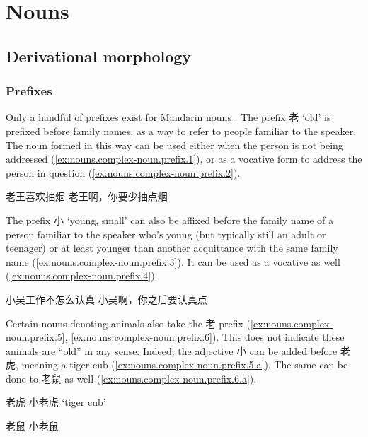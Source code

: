 \documentclass[UTF8, a4paper, oneside, scheme=plain, 12pt]{ctexrep}
\newcommand*{\citepage}[1]{p.~{#1}}
\newcommand{\translate}[1]{`#1'}
\begin{document}
\chapter{Nouns}

\section{Derivational morphology}

\subsection{Prefixes}

Only a handful of prefixes exist for Mandarin nouns
\citep[\citepage{37}]{zhudexigrammar}.
The prefix 老 \translate{old} is prefixed before family names,
as a way to refer to people familiar to the speaker.
The noun formed in this way can be used either when the person is not being addressed
(\ref{ex:nouns.complex-noun.prefix.1}),
or as a vocative form to address the person in question
(\ref{ex:nouns.complex-noun.prefix.2}).

\begin{exe}
    \ex\label{ex:nouns.complex-noun.prefix.1} 老王喜欢抽烟
    \ex\label{ex:nouns.complex-noun.prefix.2} 老王啊，你要少抽点烟
\end{exe}

The prefix 小 \translate{young, small} can also be affixed
before the family name of a person familiar to the speaker
who's young (but typically still an adult or teenager)
or at least younger than another acquittance with the same family name
(\ref{ex:nouns.complex-noun.prefix.3}).
It can be used as a vocative as well (\ref{ex:nouns.complex-noun.prefix.4}).

\begin{exe}
    \ex\label{ex:nouns.complex-noun.prefix.3} 小吴工作不怎么认真
    \ex\label{ex:nouns.complex-noun.prefix.4} 小吴啊，你之后要认真点
\end{exe}

Certain nouns denoting animals also take the 老 prefix
(\ref{ex:nouns.complex-noun.prefix.5},
\ref{ex:nouns.complex-noun.prefix.6}).
This does not indicate these animals are ``old'' in any sense.
Indeed, the adjective 小 can be added before 老虎,
meaning a tiger cub (\ref{ex:nouns.complex-noun.prefix.5.a}).
The same can be done to 老鼠 as well (\ref{ex:nouns.complex-noun.prefix.6.a}).

\begin{exe}
    \ex\label{ex:nouns.complex-noun.prefix.5} \begin{xlist}
        \ex 老虎
        \ex\label{ex:nouns.complex-noun.prefix.5.a} 小老虎
        \translate{tiger cub}
    \end{xlist}

    \ex\label{ex:nouns.complex-noun.prefix.6} \begin{xlist}
        \ex 老鼠
        \ex\label{ex:nouns.complex-noun.prefix.6.a} 小老鼠
    \end{xlist}
\end{exe}
\end{document}
